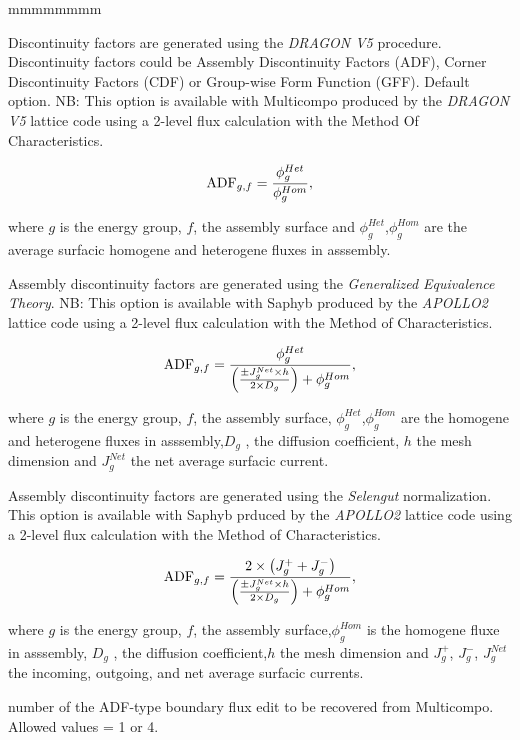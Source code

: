 \begin{ListeDeDescription}{mmmmmmmm}
\item[\moc{DRA}] Discontinuity factors are generated using the \textit{DRAGON V5} procedure. Discontinuity factors could be Assembly Discontinuity Factors (ADF), Corner Discontinuity Factors (CDF) or Group-wise Form Function (GFF).  Default option.  NB: This option is available with Multicompo produced by the \textit{DRAGON V5} lattice code using a 2-level flux calculation with the Method Of Characteristics.

$$
{\rm ADF}_{g,f} = {\phi _{g}^{Het}\over \phi _{g}^{Hom}} ,
$$

where $g$ is the energy group, $f$, the assembly surface and $\phi _{g}^{Het}$,$\phi _{g}^{Hom}$ are the average surfacic homogene and heterogene fluxes in asssembly.


\item[\moc{GET}] Assembly discontinuity factors are generated using the \textit{Generalized Equivalence Theory}. NB: This option is available with Saphyb produced by the \textit{APOLLO2} lattice code using a 2-level flux calculation with the Method of Characteristics.

$$
{\rm ADF}_{g,f} = {\phi _{g}^{Het}\over \left({\pm J_{g}^{Net} \times h \over 2 \times  D _{g}}\right) + \phi_{g}^{Hom}} ,
$$

where $g$ is the energy group, $f$, the assembly surface, $\phi _{g}^{Het}$,$\phi _{g}^{Hom}$ are the homogene and heterogene fluxes in asssembly,$D _{g}$ , the diffusion coefficient, $h$ the  mesh dimension and $J_{g}^{Net}$ the net average surfacic current. 
 
\item[\moc{SEL}] Assembly discontinuity factors are generated using the \textit{Selengut} normalization. This option is available with Saphyb prduced by the \textit{APOLLO2} lattice code using a 2-level flux calculation with the Method of Characteristics.

$$
{\rm ADF}_{g,f} = {2 \times \left( J_{g}^{+} + J_{g}^{-} \right) \over \left({\pm J_{g}^{Net} \times h \over 2 \times D _{g}}\right) + \phi _{g}^{Hom}} ,
$$

where $g$ is the energy group, $f$, the assembly surface,$\phi _{g}^{Hom}$ is the homogene fluxe in asssembly, $D _{g}$ , the diffusion coefficient,$h$ the  mesh dimension and $J _{g}^{+}$, $J _{g}^{-}$, $J _{g}^{Net}$ the incoming, outgoing, and net average surfacic currents. 

\item[\dusa{nadf}] number of the ADF-type boundary flux edit to be recovered from Multicompo. Allowed values  = 1 or 4.


\end{ListeDeDescription}
